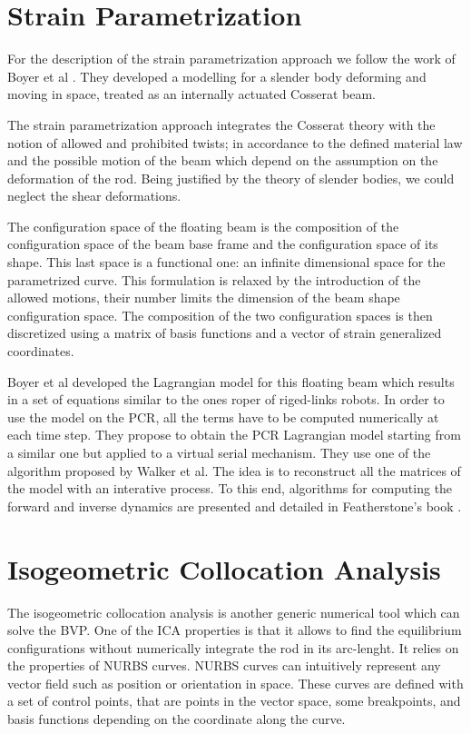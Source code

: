 \documentclass{thesisreport}
\begin{document}
 
 \section{Strain Parametrization}
 
 For the description of the strain parametrization approach we follow the work of Boyer et al \cite{boyer_dynamics_2019}. They developed a modelling for a slender body deforming and moving in space, treated as an internally actuated Cosserat beam.
 
 The strain parametrization approach integrates the Cosserat theory with the notion of allowed and prohibited twists; in accordance to the defined material law and the possible motion of the beam which depend on the assumption on the deformation of the rod. Being justified by the theory of slender bodies, we could neglect the shear deformations.
 
 The configuration space of the floating beam is the composition of the configuration space of the beam base frame and the configuration space of its shape. This last space is a functional one: an infinite dimensional space for the parametrized curve. 
 This formulation is relaxed by the introduction of the allowed motions, their number limits the dimension of the beam shape configuration space. 
 The composition of the two configuration spaces is then discretized using a matrix of basis functions and a vector of strain generalized coordinates. 
 
 Boyer et al\cite{boyer_dynamics_2019} developed the Lagrangian model for this floating beam which results in a set of equations similar to the ones roper of riged-links robots. In order to use the model on the PCR, all the terms have to be computed numerically at each time step. They propose to obtain the PCR Lagrangian model starting from a similar one but applied to a virtual serial mechanism. They use one of the algorithm proposed by Walker et al\cite{walker_efficient_1982}. The idea is to reconstruct all the matrices of the model with an interative process. To this end, algorithms for computing the forward and inverse dynamics are presented and detailed in Featherstone's book \cite{featherstone_rigid_2008}.

 
 \section{Isogeometric Collocation Analysis}
 The isogeometric collocation analysis is another generic numerical tool which can solve the BVP. One of the ICA properties is that it allows to find the equilibrium configurations without numerically integrate the rod in its arc-lenght. 
 It relies on the properties of NURBS curves\cite{piegl_nurbs_1997}. NURBS curves can intuitively represent any vector field such as position or orientation in space. These curves are defined with a set of control points, that are points in the vector space, some breakpoints, and basis functions depending on the coordinate along the curve.
 
\end{document}

